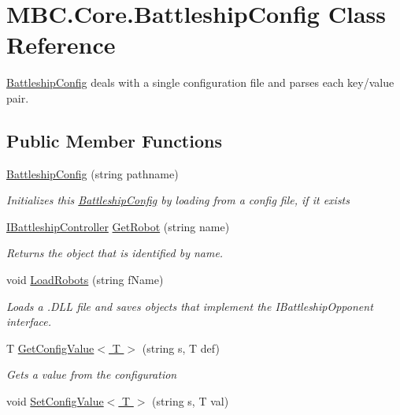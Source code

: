 \hypertarget{class_m_b_c_1_1_core_1_1_battleship_config}{\section{M\-B\-C.\-Core.\-Battleship\-Config Class Reference}
\label{class_m_b_c_1_1_core_1_1_battleship_config}
}


\hyperlink{class_m_b_c_1_1_core_1_1_battleship_config}{Battleship\-Config} deals with a single configuration file and parses each key/value pair. 


\subsection*{Public Member Functions}
\begin{DoxyCompactItemize}
\item 
\hypertarget{class_m_b_c_1_1_core_1_1_battleship_config_ad03a9d66d4f26ae80f0def1b2a79d20d}{\hyperlink{class_m_b_c_1_1_core_1_1_battleship_config_ad03a9d66d4f26ae80f0def1b2a79d20d}{Battleship\-Config} (string pathname)}\label{class_m_b_c_1_1_core_1_1_battleship_config_ad03a9d66d4f26ae80f0def1b2a79d20d}

\begin{DoxyCompactList}\small\item\em Initializes this \hyperlink{class_m_b_c_1_1_core_1_1_battleship_config}{Battleship\-Config} by loading from a config file, if it exists\end{DoxyCompactList}\item 
\hyperlink{interface_m_b_c_1_1_core_1_1_i_battleship_controller}{I\-Battleship\-Controller} \hyperlink{class_m_b_c_1_1_core_1_1_battleship_config_aae26727438f9cc22a85708fbe979884b}{Get\-Robot} (string name)
\begin{DoxyCompactList}\small\item\em Returns the object that is identified by name.\end{DoxyCompactList}\item 
void \hyperlink{class_m_b_c_1_1_core_1_1_battleship_config_a4a912843cc40d7676574d817fd434d1d}{Load\-Robots} (string f\-Name)
\begin{DoxyCompactList}\small\item\em Loads a .D\-L\-L file and saves objects that implement the I\-Battleship\-Opponent interface.\end{DoxyCompactList}\item 
T \hyperlink{class_m_b_c_1_1_core_1_1_battleship_config_ad3224c7bca99c8c6ed0dfbe8b6d15219}{Get\-Config\-Value$<$ T $>$} (string s, T def)
\begin{DoxyCompactList}\small\item\em Gets a value from the configuration\end{DoxyCompactList}\item 
\hypertarget{class_m_b_c_1_1_core_1_1_battleship_config_a83ab07d83dac1b64bd1dd16ffd9221d1}{void \hyperlink{class_m_b_c_1_1_core_1_1_battleship_config_a83ab07d83dac1b64bd1dd16ffd9221d1}{Set\-Config\-Value$<$ T $>$} (string s, T val)}\label{class_m_b_c_1_1_core_1_1_battleship_config_a83ab07d83dac1b64bd1dd16ffd9221d1}


\end{DoxyCompactItemize}

